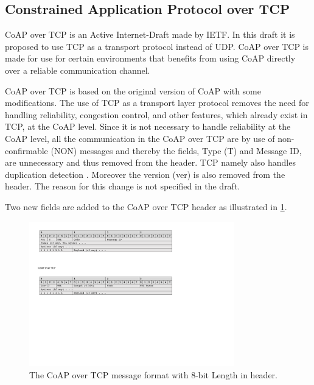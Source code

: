 


\subsection{Constrained Application Protocol over TCP}
CoAP over TCP is an Active Internet-Draft made by IETF. 
In this draft it is proposed to use TCP as a transport protocol instead of UDP.
CoAP over TCP is made for use for certain environments that benefits from using CoAP directly over a reliable communication channel.

CoAP over TCP is based on the original version of CoAP with some modifications. 
The use of TCP as a transport layer protocol removes the need for handling reliability, congestion control, and other features, which already exist in TCP, at the CoAP level.
Since it is not necessary to handle reliability at the CoAP level, all the communication in the CoAP over TCP are by use of non-confirmable (NON) messages and thereby the fields, Type (T) and Message ID, are unnecessary and thus removed from the header. 
TCP namely also handles duplication detection .
Moreover the version (ver) is also removed from the header. The reason for this change is not specified in the draft.

Two new fields are added to the CoAP over TCP header as illustrated in \figurename{\ref{fig:msgformatcoapovertcp}}.
\begin{figure}[bht]
	\centering
	\includegraphics[width=3.5in]{gfx/msgformat-coapovertcp}
	\caption{The CoAP over TCP message format with 8-bit Length in header.}
	\label{fig:msgformatcoapovertcp}
\end{figure}

